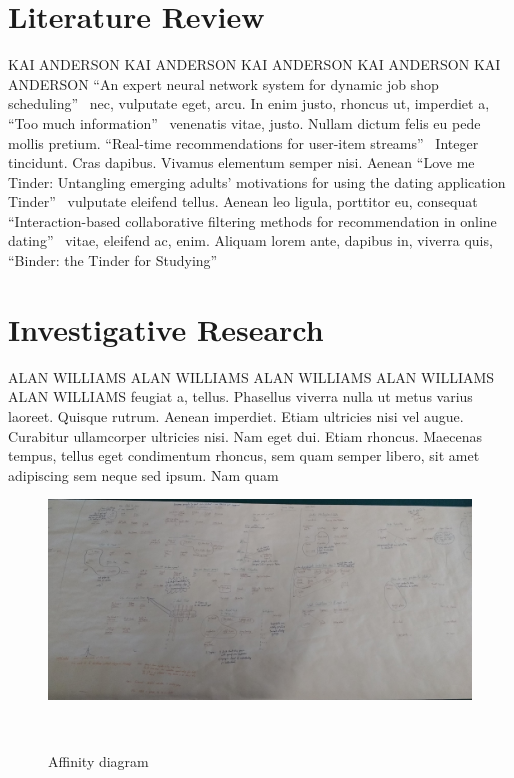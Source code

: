 \documentclass{sigchi-ext}
\begin{document}
\section{Literature Review}
KAI ANDERSON KAI ANDERSON KAI ANDERSON KAI ANDERSON KAI ANDERSON
``An expert neural network system for dynamic job shop scheduling''~\cite{sim1994expert}
nec, vulputate eget, arcu. In enim justo, rhoncus ut, imperdiet a,
``Too much information''~\cite{christensen2006too}
venenatis vitae, justo. Nullam dictum felis eu pede mollis pretium.
``Real-time recommendations for user-item streams''~\cite{lommatzsch2015real}
Integer tincidunt. Cras dapibus. Vivamus elementum semper nisi. Aenean
``Love me Tinder: Untangling emerging adults' motivations for using the dating application Tinder''~\cite{sumter2017love}
vulputate eleifend tellus. Aenean leo ligula, porttitor eu, consequat
``Interaction-based collaborative filtering methods for recommendation in online dating''~\cite{krzywicki2010interaction}
vitae, eleifend ac, enim. Aliquam lorem ante, dapibus in, viverra quis,
``Binder: the Tinder for Studying''~\cite{binder}



\section{Investigative Research}
ALAN WILLIAMS ALAN WILLIAMS ALAN WILLIAMS ALAN WILLIAMS ALAN WILLIAMS
feugiat a, tellus. Phasellus viverra nulla ut metus varius laoreet.
Quisque rutrum. Aenean imperdiet. Etiam ultricies nisi vel augue.
Curabitur ullamcorper ultricies nisi. Nam eget dui.
Etiam rhoncus. Maecenas tempus, tellus eget condimentum rhoncus, sem
quam semper libero, sit amet adipiscing sem neque sed ipsum. Nam quam

\begin{figure}
  \includegraphics[width=0.9\columnwidth]{figures/affinity_diagram.jpg}
  \caption{Affinity diagram}~\label{fig:sample}
\end{figure}
\end{document}
